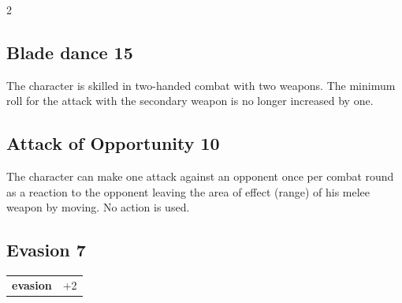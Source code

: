 \begin{multicols}{2}
\begin{tcolorbox}
\vspace{3mm}



\end{tcolorbox}

\begin{tcolorbox}
    \subsection*{Blade dance \hfill \small{15 }}
    \tcblower
The character is skilled in two-handed combat with two weapons. The minimum roll for the attack with the secondary weapon is no longer increased by one.


\vspace{3mm}



\end{tcolorbox}

\begin{tcolorbox}
    \subsection*{Attack of Opportunity \hfill \small{10 }}
    \tcblower
The character can make one attack against an opponent once per combat round as a reaction to the opponent leaving the area of effect (range) of his melee weapon by moving. No action is used.


\vspace{3mm}



\end{tcolorbox}

\begin{tcolorbox}
    \subsection*{Evasion \hfill \small{7 }}
    \tcblower




\begin{tabular}{@{}ll@{}}
    \textbf{evasion} & +2\\
\end{tabular}


\end{tcolorbox}
\end{multicols}
